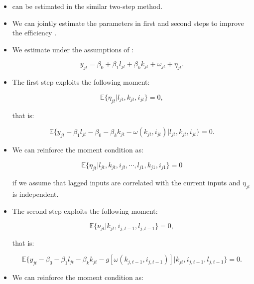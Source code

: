 \documentclass[]{book}
\providecommand{\tightlist}{%
  \setlength{\itemsep}{0pt}\setlength{\parskip}{0pt}}
\begin{document}
\begin{itemize}
\tightlist
\item
  \citet{Levinsohn2003} can be estimated in the similar two-step method.
\item
  We can jointly estimate the parameters in first and second steps to
  improve the efficiency \citep{Wooldridge2009}.
\item
  We estimate under the assumptions of \citet{Olley1996}:

  \begin{equation}
  y_{jt} = \beta_0 + \beta_1 l_{jt} + \beta_k k_{jt} + \omega_{jt} + \eta_{jt}.
  \end{equation}
\item
  The first step exploits the following moment:

  \begin{equation}
  \mathbb{E}\{\eta_{jt}|l_{jt}, k_{jt}, i_{jt}\} = 0,
  \end{equation}

  that is:

  \begin{equation}
  \mathbb{E}\{y_{jt} - \beta_1 l_{jt} - \beta_0 - \beta_k k_{jt} - \omega(k_{jt}, i_{jt})|l_{jt}, k_{jt}, i_{jt}\} = 0. \label{eq:opfirst}
  \end{equation}
\item
  We can reinforce the moment condition as:

  \begin{equation}
  \mathbb{E}\{\eta_{jt}|l_{jt}, k_{jt}, i_{jt}, \cdots, l_{j1}, k_{j1}, i_{j1}\} = 0
  \end{equation}

  if we assume that lagged inputs are correlated with the current inputs
  and \(\eta_{jt}\) is independent.
\item
  The second step exploits the following moment:

  \begin{equation}
  \mathbb{E}\{\nu_{jt}|k_{jt}, i_{j, t - 1}, l_{j, t - 1}\} = 0,
  \end{equation}

  that is:

  \begin{equation}
  \mathbb{E}\{y_{jt} - \beta_0 - \beta_1 l_{jt} - \beta_k k_{jt} - g[\omega(k_{j,t - 1}, i_{j, t - 1})]|k_{jt}, i_{j, t - 1}, l_{j, t - 1}\} = 0. \label{eq:opsecond}
  \end{equation}
\item
  We can reinforce the moment condition as:


\end{itemize}
\end{document}
